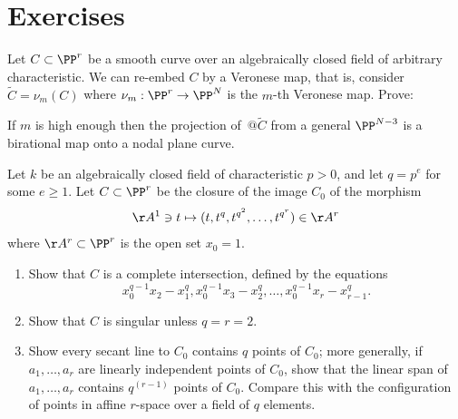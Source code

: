 \section{Exercises}

\begin{exercise}
Let $C\subset \PP^r$ be a smooth curve
over an algebraically closed field of arbitrary characteristic.
We can
re-embed $C$ by a
Veronese map,
that is, consider $\widetilde C = \nu_m(C)$ where
$\nu_m :
\PP^r \to \PP^N$ is the $m$-th Veronese map. Prove:

\begin{proposition}
\label{positive characteristic nodes}
If $m$ is high enough then
the projection of~$@\widetilde C$ from a general $\PP^{N-3}$
is a birational map onto a nodal
plane curve.
\end{proposition}
\end{exercise}

\begin{npt}
\begin{exercise}
\label{strange curves} Let $k$ be an
%
algebraically closed field of characteristic $p>0$, and let $q=p^e$
for some $e\geq 1$. Let $C\subset \PP^r$
be the closure of the image $C_0$ of the morphism
$$
\AA^1 \ni t \mapsto (t, t^q, t^{q^2}, \dots , t^{q^{r}}) \in \AA^r
$$
where $\AA^r\subset \PP^r$ is the open set $x_0=1$.
\begin{enumerate}
\item Show that $C$ is a complete intersection, defined by the equations
$$
x_0^{q-1}x_2 - x_1^q, x_0^{q-1}x_3 - x_2^q,\dots,
x_0^{q-1}x_r - x_{r-1}^q.
$$
\item Show that $C$ is singular unless $q = r = 2$.
\item Show every secant line to $C_0$ contains $q$ points of $C_0$;
more generally, if
$a_1, \dots, a_r$ are linearly independent points of $C_0$, show that
the linear span of
$a_1, \dots, a_r$ contains $q^{(r-1)}$ points of $C_0$.  Compare this
with the configuration of
points in affine $r$-space over a field of $q$ elements.
\end{enumerate}
\end{exercise}
\end{npt}


